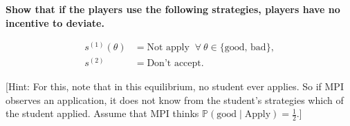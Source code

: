 \documentclass[10pt]{article}
\begin{document}
\textbf{Show that if the players use the following strategies, players have no incentive to
deviate.}

\begin{align*}
    s^{(1)}(\theta) & = \text{Not apply } \ \forall \ \theta \in \{\text{good, bad}\}, \\
    s^{(2)} & = \text{Don't accept}.
\end{align*}

[Hint: For this, note that in this equilibrium, no student ever applies. So if MPI
observes an application, it does not know from the student's strategies which
of the student applied. Assume that MPI thinks
\(\mathbb{P}(\text{good} \mid \text{Apply}) = \frac{1}{2}\).]
\end{document}
